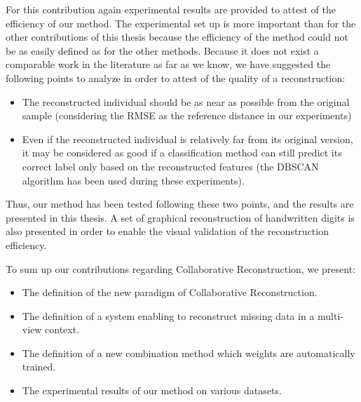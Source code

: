 For this contribution again experimental results are provided to attest of the efficiency of our method. The experimental set up is more important than for the other contributions of this thesis because the efficiency of the method could not be as easily defined as for the other methods. Because it does not exist a comparable work in the literature as far as we know, we have suggested the following points to analyze in order to attest of the quality of a reconstruction:
\begin{itemize}
    \item The reconstructed individual should be as near as possible from the original sample (considering the RMSE as the reference distance in our experiments)
    \item Even if the reconstructed individual is relatively far from its original version, it may be considered as good if a classification method can still predict its correct label only based on the reconstructed features (the DBSCAN algorithm has been used during these experiments).
\end{itemize}

Thus, our method has been tested following these two points, and the results are presented in this thesis. A set of graphical reconstruction of handwritten digits is also presented in order to enable the visual validation of the reconstruction efficiency.

To sum up our contributions regarding Collaborative Reconstruction, we present:
\begin{itemize}
    \item The definition of the new paradigm of Collaborative Reconstruction.
    \item The definition of a system enabling to reconstruct missing data in a multi-view context.
    \item The definition of a new combination method which weights are automatically trained.
    \item The experimental results of our method on various datasets.
\end{itemize}


